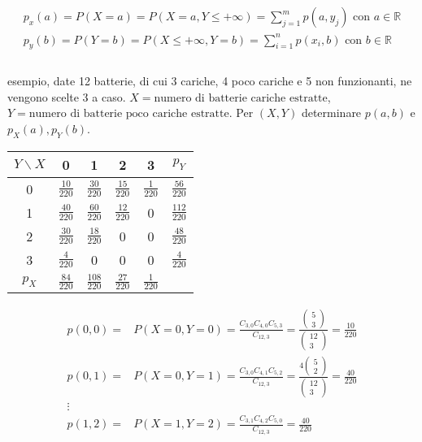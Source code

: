 \documentclass{article}
\begin{document}
$$
\begin{matrix}
p_x(a) = P(X=a) = P(X=a, Y\leq+\infty) = \sum^m_{j=1} p(a, y_j) \text{ con } a \in \mathbb{R} \\
p_y(b) = P(Y=b) = P(X\leq+\infty, Y=b) = \sum^n_{i=1} p(x_i, b) \text{ con } b \in \mathbb{R} \\
\end{matrix}
$$\\

\noindent
esempio, date 12 batterie, di cui 3 cariche, 4 poco cariche e 5 non funzionanti, ne vengono scelte 3 a caso.
$X = \text{numero di batterie cariche estratte}$, $Y = \text{numero di batterie poco cariche estratte}$.
Per $(X,Y)$ determinare $p(a,b)$ e $p_X(a),p_Y(b)$.

\begin{center}
\renewcommand{\arraystretch}{2}
\begin{tabular}{ |c|c|c|c|c|c| }
\hline
$Y \backslash X$ & 0 & 1 & 2 & 3 & $p_Y$ \\
\hline
\hline
0 & $\frac{10}{220}$ & $\frac{30}{220}$ & $\frac{15}{220}$ & $\frac{1}{220}$ & $\frac{56}{220}$ \\
1 & $\frac{40}{220}$ & $\frac{60}{220}$ & $\frac{12}{220}$ & 0 & $\frac{112}{220}$ \\
2 & $\frac{30}{220}$ & $\frac{18}{220}$ & 0 & 0 & $\frac{48}{220}$ \\
3 & $\frac{4}{220}$ & 0 & 0 & 0 & $\frac{4}{220}$ \\
\hline
$p_X$ & $\frac{84}{220}$ & $\frac{108}{220}$ & $\frac{27}{220}$ & $\frac{1}{220}$ & \\
\hline
\end{tabular}
\renewcommand{\arraystretch}{1}
\end{center}

$$
\begin{matrix}
p(0,0) =& P(X=0, Y=0) = \frac{C_{3,0}C_{4,0}C_{5,3}}{C_{12,3}} = \frac{\begin{pmatrix}5\\3\end{pmatrix}}{\begin{pmatrix}12\\3\end{pmatrix}} = \frac{10}{220} \\
p(0,1) =& P(X=0, Y=1) = \frac{C_{3,0}C_{4,1}C_{5,2}}{C_{12,3}} = \frac{4\begin{pmatrix}5\\2\end{pmatrix}}{\begin{pmatrix}12\\3\end{pmatrix}} = \frac{40}{220} \\
\vdots &  \\
p(1,2) =& P(X=1, Y=2) = \frac{C_{3,1}C_{4,2}C_{5,0}}{C_{12,3}} = \frac{40}{220} \\
\end{matrix}
$$
\end{document}
